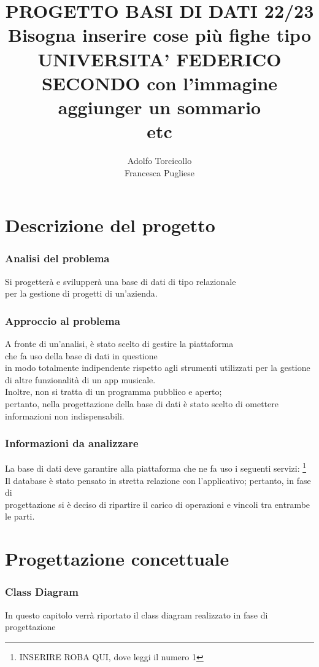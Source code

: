 \documentclass[11pt]{article}
\title{PROGETTO BASI DI DATI 22/23 \\ Bisogna inserire cose più fighe tipo \\ UNIVERSITA' FEDERICO SECONDO con l'immagine \\ aggiunger un sommario \\ etc }
\author{Adolfo Torcicollo \\ Francesca Pugliese}
\date{}  												%
\begin{document}
	
	\part{Descrizione del progetto}
	\section{Analisi del problema}
	
	Si progetterà e svilupperà una base di dati di tipo relazionale\\ per la gestione di progetti di un’azienda. \\
	
	\section{Approccio al problema}
	
	A fronte di un’analisi, è stato scelto di gestire la piattaforma\\ che fa uso della base di dati in questione \\
	in modo totalmente indipendente rispetto agli strumenti utilizzati per la gestione di altre funzionalità di un app musicale.\\
	Inoltre, non si tratta di un programma pubblico e aperto;\\ pertanto, nella progettazione della base di dati è stato scelto di omettere 
	informazioni non indispensabili.\\
	
	\section{Informazioni da analizzare}
	
	La base di dati deve garantire alla piattaforma che ne fa uso i seguenti servizi:
	\footnote{INSERIRE ROBA QUI, dove leggi il numero 1}
	\\
	Il database è stato pensato in stretta relazione con l’applicativo; pertanto, in fase di \\ 
	progettazione si è deciso di ripartire il carico di operazioni e vincoli tra entrambe le parti.\\
	
	\clearpage
	
	\part{Progettazione concettuale}
	\section{Class Diagram}
	In questo capitolo verrà riportato il class diagram realizzato in fase di progettazione \\
\end{document}
